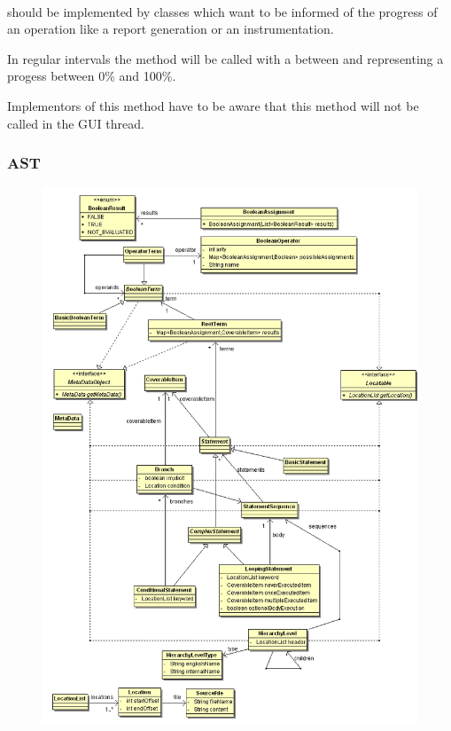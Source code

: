 \paragraph{}

 should be implemented by classes which want to be
informed of the progress of an operation like a report generation or
an instrumentation.

In regular intervals the method  will be called with
a  between  and  representing a progess
between 0\% and 100\%.

Implementors of this method have to be aware that this method will not
be called in the GUI thread.

\subsubsection{AST}

\begin{figure}[hbtp]
 \centering
 \includegraphics[width=1.0\textwidth]{images/Model/ast.png}
 \caption{}
 \label{figure:Classes:Model:AST}
\end{figure}

